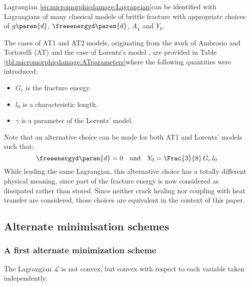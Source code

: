 Lagrangian \eqref{eq:micromorphicdamage:Lagrangian}can be identified with
Lagrangians of many classical models of brittle fracture with
appropriate choices of $g\paren{d}$, $\freeenergyd\paren{d}$,
$A_{\chi}$ and $Y_{0}$.

The cases of AT1 and AT2 models, originating from the work of Ambrosio
and Tortorelli (AT) \cite{ambrosio_approximation_1990} and the case of
Lorentz's model \cite{lorentz_gradient_2011,lorentz_convergence_2011}, are
provided in Table \ref{tbl:micromorphicdamage:ATparameters}where the
following quantities were introduced:
%
%
%
\begin{itemize}
  \item $G_{c}$ is the fracture energy.
  \item $l_{0}$ is a characteristic length.
  \item $\gamma$ is a parameter of the Lorentz' model.
\end{itemize}


Note that an alternative choice can be made for both AT1 and Lorentz' models such that:
\[
\freeenergyd\paren{d}= 0  \quad\text{and}\quad Y_{0}=\Frac{3}{8}\,G_{c}\,l_{0}
\]
While leading the same Lagrangian, this alternative choice has a totally
different physical meaning, since part of the fracture energy is now
considered as dissipated rather than stored. Since neither crack healing
nor coupling with heat transfer are considered, those choices are
equivalent in the context of this paper.

\subsection{Alternate minimisation schemes}
\label{sec:micromorphicdamage:alternate_minimisation}

\subsubsection{A first alternate minimization scheme}

The Lagrangian $\mathcal{L}$ is not convex, but convex with respect to
each variable taken independently.

